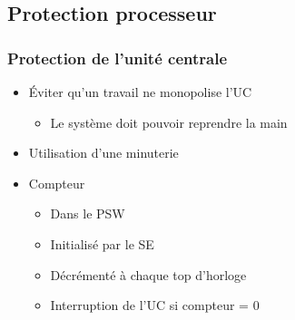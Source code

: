 %
%
%
%



\subsection{Protection processeur}

\begin{frame}
 \frametitle{Protection de l’unité centrale}
 \begin{itemize}
 \item Éviter qu’un travail ne monopolise l’UC
\begin{itemize}
\item Le système doit pouvoir reprendre la main
\end{itemize}
\item Utilisation d’une minuterie
\item Compteur
\begin{itemize}
\item Dans le PSW
\item Initialisé par le SE
\item Décrémenté à chaque top d’horloge
\item Interruption de l’UC si compteur = 0
\end{itemize}
 \end{itemize}
\end{frame}


